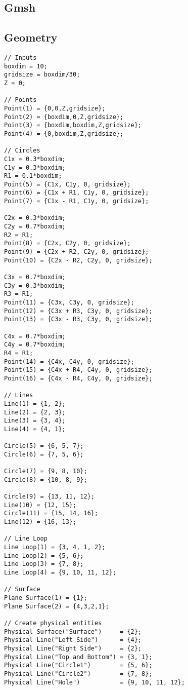 \begin{appendices}
\chapter{Gmsh}
\section{Geometry}
\begin{verbatim}
// Inputs
boxdim = 10;
gridsize = boxdim/30;
Z = 0; 

// Points
Point(1) = {0,0,Z,gridsize};
Point(2) = {boxdim,0,Z,gridsize};
Point(3) = {boxdim,boxdim,Z,gridsize};
Point(4) = {0,boxdim,Z,gridsize};

// Circles
C1x = 0.3*boxdim;
C1y = 0.3*boxdim;
R1 = 0.1*boxdim;
Point(5) = {C1x, C1y, 0, gridsize};
Point(6) = {C1x + R1, C1y, 0, gridsize};
Point(7) = {C1x - R1, C1y, 0, gridsize};

C2x = 0.3*boxdim;
C2y = 0.7*boxdim;
R2 = R1;
Point(8) = {C2x, C2y, 0, gridsize};
Point(9) = {C2x + R2, C2y, 0, gridsize};
Point(10) = {C2x - R2, C2y, 0, gridsize};

C3x = 0.7*boxdim;
C3y = 0.3*boxdim;
R3 = R1;
Point(11) = {C3x, C3y, 0, gridsize};
Point(12) = {C3x + R3, C3y, 0, gridsize};
Point(13) = {C3x - R3, C3y, 0, gridsize};

C4x = 0.7*boxdim;
C4y = 0.7*boxdim;
R4 = R1;
Point(14) = {C4x, C4y, 0, gridsize};
Point(15) = {C4x + R4, C4y, 0, gridsize};
Point(16) = {C4x - R4, C4y, 0, gridsize};

// Lines
Line(1) = {1, 2};
Line(2) = {2, 3};
Line(3) = {3, 4};
Line(4) = {4, 1};

Circle(5) = {6, 5, 7};
Circle(6) = {7, 5, 6};

Circle(7) = {9, 8, 10};
Circle(8) = {10, 8, 9};

Circle(9) = {13, 11, 12};
Line(10) = {12, 15};
Circle(11) = {15, 14, 16};
Line(12) = {16, 13};

// Line Loop
Line Loop(1) = {3, 4, 1, 2};
Line Loop(2) = {5, 6};
Line Loop(3) = {7, 8};
Line Loop(4) = {9, 10, 11, 12}; 

// Surface
Plane Surface(1) = {1};
Plane Surface(2) = {4,3,2,1};

// Create physical entities
Physical Surface("Surface") 	= {2};
Physical Line("Left Side") 		= {4};
Physical Line("Right Side") 	= {2};
Physical Line("Top and Bottom") = {3, 1};
Physical Line("Circle1")		= {5, 6};
Physical Line("Circle2")		= {7, 8};
Physical Line("Hole")			= {9, 10, 11, 12}; 

\end{verbatim}

\end{appendices}
